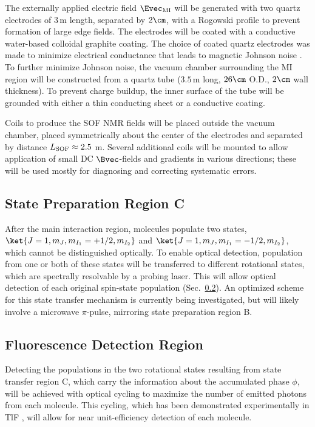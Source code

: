 The externally applied electric field $\Evec_\mathrm{MI}$ will be generated with two quartz electrodes of $3\,$m length, separated by $2\cm$, with a Rogowski profile \cite{rogowski1923profile, highvoltage2000} to prevent formation of large edge fields. The electrodes will be coated with a conductive water-based colloidal graphite coating. The choice of coated quartz electrodes was made to minimize electrical conductance that leads to magnetic Johnson noise \cite{PhysRevA.60.1717, doi:10.1063/1.2737357, doi:10.1063/1.2885711}. To further minimize Johnson noise, the vacuum chamber surrounding the MI region will be constructed from a quartz tube ($3.5\,$m long, $26\cm$ O.D., $2\cm$ wall thickness). To prevent charge buildup, the inner surface of the tube will be grounded with either a thin conducting sheet or a conductive coating. 

Coils to produce the SOF NMR fields will be placed outside the vacuum chamber, placed symmetrically about the center of the electrodes and separated by distance $L_{\rm SOF} \approx 2.5$ m.  Several additional coils will be mounted to allow application of small DC $\Bvec$-fields and gradients in various directions; these will be used mostly for diagnosing and correcting systematic errors.  

\subsection{State Preparation Region C}
\label{sec:state_preparation_region_c}
After the main interaction region, molecules populate two states, $\ket{J=1,m_J,m_{I_1}=+1/2,m_{I_2}}$ and $\ket{J=1,m_J,m_{I_1}=-1/2,m_{I_2}}$, which cannot be distinguished optically. To enable optical detection, population from one or both of these states will be transferred to different rotational states, which are spectrally resolvable by a probing laser.  This will allow optical detection of each original spin-state population (Sec.~\ref{sec:detection_region}). An optimized scheme for this state transfer mechanism is currently being investigated, but will likely involve a microwave $\pi$-pulse, mirroring state preparation region B.

\subsection{Fluorescence Detection Region}
\label{sec:detection_region}
Detecting the populations in the two rotational states resulting from state transfer region C, which carry the information about the accumulated phase $\phi$, will be achieved with optical cycling to maximize the number of emitted photons from each molecule. This cycling, which has been demonstrated experimentally in TlF \cite{privateHunter2019}, will allow for near unit-efficiency detection of each molecule. 

